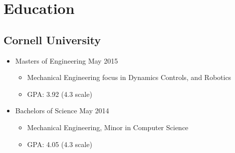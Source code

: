 \documentclass{BradyResume}
\begin{document}
\maketitle
\vspace*{-1em}
\section*{Education}
\subsection*{Cornell University}
\begin{itemize}
\item Masters of Engineering 
\dotfill May 2015
  \begin{itemize}
      \item Mechanical Engineering focus in Dynamics Controls, and Robotics
      \item GPA: 3.92 (4.3 scale)
  \end{itemize}
\item Bachelors of Science 
\dotfill May 2014
  \begin{itemize}
  \item Mechanical Engineering, Minor in Computer Science
  \item GPA: 4.05 (4.3 scale)
  \end{itemize}
\end{itemize}
\end{document}
